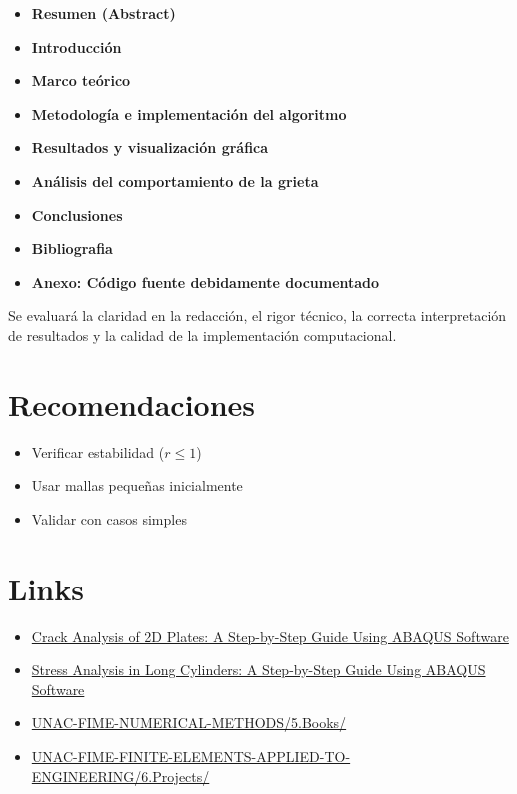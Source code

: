 \documentclass[a4paper,10pt]{exam}
\begin{document}
\begin{itemize}
\item \textbf{Resumen (Abstract)}
\item \textbf{Introducción}
\item \textbf{Marco teórico}
\item \textbf{Metodología e implementación del algoritmo}
\item \textbf{Resultados y visualización gráfica}
\item \textbf{Análisis del comportamiento de la grieta}
\item \textbf{Conclusiones}
\item \textbf{Bibliografia}
\item \textbf{Anexo: Código fuente debidamente documentado}
\end{itemize}

Se evaluará la claridad en la redacción, el rigor técnico, la correcta interpretación de resultados y la calidad de la implementación computacional.

\section*{Recomendaciones}
\begin{itemize}
\item Verificar estabilidad ($r \leq 1$)
\item Usar mallas pequeñas inicialmente
\item Validar con casos simples
\end{itemize}

\section{Links}
\begin{itemize}
\item \href{https://www.youtube.com/watch?v=miUDHRq-B0o}{Crack Analysis of 2D Plates: A Step-by-Step Guide Using ABAQUS Software}
\item \href{https://www.youtube.com/watch?v=lYXt7BViiEI}{Stress Analysis in Long Cylinders: A Step-by-Step Guide Using ABAQUS Software}
\item \href{https://github.com/hrmoncada/UNAC-FIME-NUMERICAL-METHODS/tree/main/5.Books}{UNAC-FIME-NUMERICAL-METHODS/5.Books/}
\item \href{https://github.com/hrmoncada/UNAC-FIME-FINITE-ELEMENTS-APPLIED-TO-ENGINEERING/tree/main/6.Projects}{UNAC-FIME-FINITE-ELEMENTS-APPLIED-TO-ENGINEERING/6.Projects/}
\end{itemize}
\end{document}
